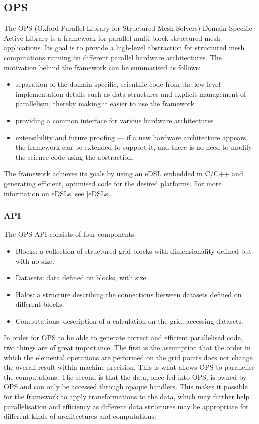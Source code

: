 \documentclass[fontsize=11pt, appendixprefix=true]{scrreprt}
\begin{document}
\subsection{OPS}

The OPS (Oxford Parallel Library for Structured Mesh Solvers) Domain Specific
Active Library is a framework for parallel multi-block structured mesh
applications. Its goal is to provide a high-level abstraction for structured
mesh computations running on different parallel hardware architectures. The
motivation behind the framework can be summarised as follows:

\begin{itemize}
  \item separation of the domain specific, scientific code from the low-level
    implementation details such as data structures and explicit management of
    parallelism, thereby making it easier to use the framework
  \item providing a common interface for various hardware architectures
  \item extensibility and future proofing --- if a new hardware architecture
    appears, the framework can be extended to support it, and there is no need
    to modify the science code using the abstraction.
\end{itemize}

The framework achieves its goals by using an eDSL embedded in C/C++ and
generating efficient, optimised code for the desired platforms. For more
information on eDSLs, see \autoref{eDSLs}.

\subsubsection{API}

The OPS API consists of four components:

\begin{itemize}
  \item Blocks: a collection of structured grid blocks with dimensionality
    defined but with no size.
  \item Datasets: data defined on blocks, with size.
  \item Halos: a structure describing the connections between datasets defined
    on different blocks.
  \item Computations: description of a calculation on the grid, accessing
    datasets.
\end{itemize}

In order for OPS to be able to generate correct and efficient parallelised code,
two things are of great importance. The first is the assumption that the order
in which the elemental operations are performed on the grid points does not
change the overall result within machine precision. This is what allows OPS to
parallelise the computations. The second is that the data, once fed into OPS, is
owned by OPS and can only be accessed through opaque handlers. This makes it
possible for the framework to apply transformations to the data, which may
further help parallelisation and efficiency as different data structures may be
appropriate for different kinds of architectures and computations.
\end{document}
